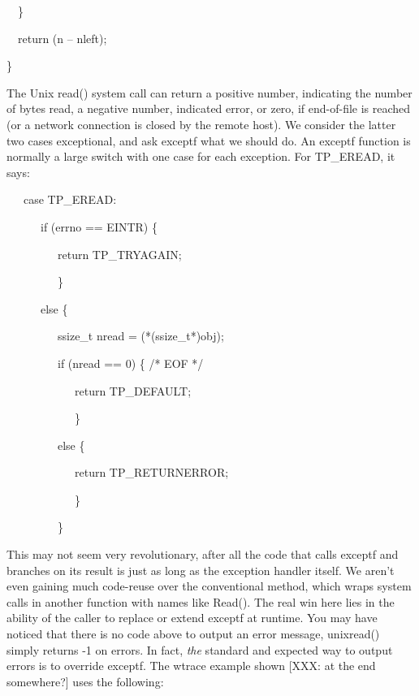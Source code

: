 {\ttfamily\mdseries
\ \ \}}

{\ttfamily\mdseries
\ \ return (n -- nleft);}

{\ttfamily\mdseries
\}}


The Unix read() system call can return a positive number, indicating
the number of bytes read, a negative number, indicated error, or zero,
if end-of-file is reached (or a network connection is closed by the
remote host). We consider the latter two cases exceptional, and ask
exceptf what we should do. An exceptf function is normally a large
switch with one case for each exception. For TP\_EREAD, it says:

{\ttfamily\mdseries
\ \ \ case TP\_EREAD:}

{\ttfamily\mdseries
\ \ \ \ \ \ if (errno == EINTR) \{}

{\ttfamily\mdseries
\ \ \ \ \ \ \ \ \ return TP\_TRYAGAIN;}

{\ttfamily\mdseries
\ \ \ \ \ \ \ \ \ \}}

{\ttfamily\mdseries
\ \ \ \ \ \ else \{}

{\ttfamily\mdseries
\ \ \ \ \ \ \ \ \ ssize\_t nread = (*(ssize\_t*)obj);}

{\ttfamily\mdseries
\ \ \ \ \ \ \ \ \ if (nread == 0) \{ /* EOF */}

{\ttfamily\mdseries
\ \ \ \ \ \ \ \ \ \ \ \ return TP\_DEFAULT;}

{\ttfamily\mdseries
\ \ \ \ \ \ \ \ \ \ \ \ \}}

{\ttfamily\mdseries
\ \ \ \ \ \ \ \ \ else \{}

{\ttfamily\mdseries
\ \ \ \ \ \ \ \ \ \ \ \ return TP\_RETURNERROR;}

{\ttfamily\mdseries
\ \ \ \ \ \ \ \ \ \ \ \ \}}

{\ttfamily\mdseries
\ \ \ \ \ \ \ \ \ \}}


This may not seem very revolutionary, after all the code that calls
exceptf and branches on its result is just as long as the exception
handler itself. We aren't even gaining much code-reuse over the
conventional method, which wraps system calls in another function with
names like Read(). The real win here lies in the ability of the
caller to replace or extend exceptf at runtime. You may have noticed
that there is no code above to output an error message, unixread()
simply returns -1 on errors. In fact, \textit{the} standard and
expected way to output errors is to override exceptf. The wtrace
example shown [XXX: at the end somewhere?] uses the following:

